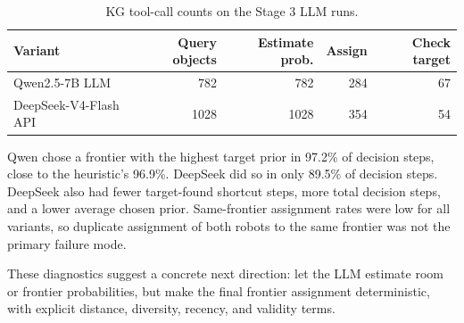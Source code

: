 \documentclass[11pt]{article}
\newcommand{\tablefont}{\footnotesize}
\begin{document}
\begin{table}[t]
\centering
\tablefont
\caption{KG tool-call counts on the Stage 3 LLM runs.}
\label{tab:tool-call-diagnostics}
\begin{tabular}{lrrrr}
\hline
Variant & Query objects & Estimate prob. & Assign & Check target \\
\hline
Qwen2.5-7B LLM & 782 & 782 & 284 & 67 \\
DeepSeek-V4-Flash API & 1028 & 1028 & 354 & 54 \\
\hline
\end{tabular}
\end{table}

Qwen chose a frontier with the highest target prior in 97.2\% of decision
steps, close to the heuristic's 96.9\%. DeepSeek did so in only 89.5\% of
decision steps. DeepSeek also had fewer target-found shortcut steps, more total
decision steps, and a lower average chosen prior. Same-frontier assignment rates
were low for all variants, so duplicate assignment of both robots to the same
frontier was not the primary failure mode.

These diagnostics suggest a concrete next direction: let the LLM estimate room
or frontier probabilities, but make the final frontier assignment deterministic,
with explicit distance, diversity, recency, and validity terms.
\end{document}
